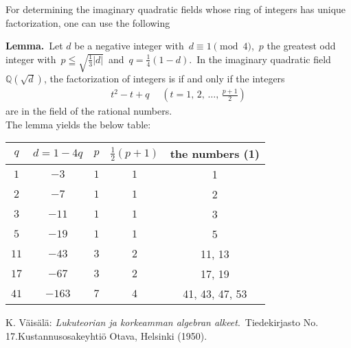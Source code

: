 \documentclass[12pt]{article}
\theoremstyle{definition}
\begin{document}
For determining the imaginary quadratic fields whose ring of integers has unique factorization, one can use the following

\textbf{Lemma.}\, Let $d$ be a negative integer with\, $d \equiv 1 \pmod{4}$,\, $p$ the greatest odd  integer with\, $p \leqq \sqrt{\frac{1}{3}|d|}$\, and\, $q = \frac{1}{4}(1\!-\!d)$.\, In the imaginary quadratic field 
$\mathbb{Q}(\sqrt{d})$, the factorization of integers is  if and only if the integers
\begin{align}
t^2\!-\!t\!+\!q \quad\; \left(t = 1,\,2,\,\ldots,\, \frac{p\!+\!1}{2}\right)
\end{align}
are  in the field of the rational numbers.\\


The lemma yields the below table:
\begin{center}
\begin{tabular}{||c|c|c|c|c||}
\hline\hline
$q$ & $d = 1-4q$ & $p$ & $\frac{1}{2}(p\!+\!1)$ & the numbers (1)\\
\hline\hline
$1$ & $-3$ & $1$ & $1$ & 1\\
\hline
$2$ & $-7$ & $1$ & $1$ & 2\\
\hline
$3$ & $-11$ & $1$ & $1$ & 3\\
\hline
$5$ & $-19$ & $1$ & $1$ & 5\\
\hline
$11$ & $-43$ & $3$ & $2$ & 11, 13\\
\hline
$17$ & $-67$ & $3$ & $2$ & 17, 19\\
\hline
$41$ & $-163$ & $7$ & $4$ & 41, 43, 47, 53\\
\hline
\end{tabular}
\end{center}

\begin{thebibliography}{9}
 {\sc K. V\"ais\"al\"a}: {\em Lukuteorian ja korkeamman algebran alkeet}.\, Tiedekirjasto No. 17.\quad  Kustannusosakeyhti\"o Otava, Helsinki (1950).
\end{thebibliography}
\end{document}
